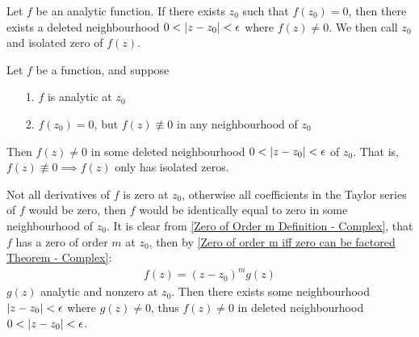 \documentclass[12pt, english]{book}
\makeatletter
\renewenvironment{proof}[1][\proofname]{\par
	\pushQED{\qed}%
	\normalfont \topsep6\p@\@plus6\p@\relax
	\list{}{%
		\settowidth{\leftmargin}{\itshape\proofname:\hskip\labelsep}%
		\setlength{\labelwidth}{0pt}%
		\setlength{\itemindent}{-\leftmargin}%
	}%
	\item[\hskip\labelsep\itshape#1\@addpunct{:}]\ignorespaces
	}{ \popQED\endlist\@endpefalse}
\makeatother
\begin{document}
	\begin{definition}
		Let \(f\) be an analytic function. If there exists \(z_0\) such that \(f(z_0) = 0\), then there exists a deleted neighbourhood \(0 < \abs{z-z_0} < \epsilon\) where \(f(z) \neq 0\). We then call \(z_0\) and isolated zero of \(f(z)\).
	\end{definition}
	
	\begin{theorem}
		\label{f nequiv 0 in some neighbourhood of z_0 implies f neq 0 in some deleted neighbourhood of z_0 Theorem - Complex}
		Let \(f\) be a function, and suppose
		\begin{itemize}
			\item[1.] \(f\) is analytic at \(z_0\)
			\item[2.] \(f(z_0) = 0\), but \(f(z) \nequiv 0\) in any neighbourhood of \(z_0\)
		\end{itemize}
		Then \(f(z) \neq 0\) in some deleted neighbourhood \(0<\abs{z-z_0}<\epsilon\) of \(z_0\). That is, \(f(z) \nequiv 0 \implies f(z)\) only has isolated zeros.
	\end{theorem}
	\begin{proof}
		Not all derivatives of \(f\) is zero at \(z_0\), otherwise all coefficients in the Taylor series of \(f\) would be zero, then \(f\) would be identically equal to zero in some neighbourhood of \(z_0\). It is clear from \cref{Zero of Order m Definition - Complex}, that \(f\) has a zero of order \(m\) at \(z_0\), then by \cref{Zero of order m iff zero can be factored Theorem - Complex}:
		\begin{align*}
			f(z) = (z-z_0)^m g(z)
		\end{align*}
		\(g(z)\) analytic and nonzero at \(z_0\). Then there exists some neighbourhood \(\abs{z-z_0}<\epsilon\) where \(g(z) \neq 0\), thus \(f(z) \neq 0\) in deleted neighbourhood \(0 < \abs{z-z_0}<\epsilon\).
	\end{proof}
\end{document}
